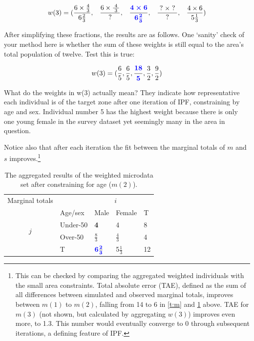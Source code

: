 \documentclass[a4paper, 11pt, twoside]{article}
\begin{document}
\begin{equation}
w(3) = (\frac{6 \times \frac{4}{3}}{6 \frac{2}{3}},\;\;\; \frac{6 \times
\frac{\;4\;}{\;3\;}}{\;?\;},\;\;\; \boldsymbol{ \frac{\color{blue}4 \times 6}{\color{blue} 6\frac{2}{3}
}}, \;\;\;\frac{\;?\; \times \;?\;}{?}, \;\;\;\frac{4 \times 6}{5 \frac{1}{3}})
\end{equation}

After simplifying these fractions, the results are as follows.
One `sanity' check of your method here is whether the sum of these
weights is still equal to the area's total population of twelve. Test this is
true:

\begin{equation}
w(3) = (\frac{6}{5}, \frac{6}{5}, \boldsymbol{\frac{\color{blue}18}{\color{blue}5}}, \frac{3}{2},
\frac{9}{2})
\label{finalout}
\end{equation}

What do the weights in w(3) actually mean? They indicate how representative
each individual is of the target zone after one iteration of IPF, constraining
by age and sex. Individual number 5 has the highest weight because there is
only one young female in the survey dataset yet seemingly many in the area in
question.

Notice also that after each iteration the fit between the marginal
totals of $m$ and $s$
improves.\footnote{This can be checked by comparing the aggregated weighted
individuals with the small area constraints. Total absolute error (TAE),
defined as the sum of all differences between simulated and observed marginal
totals, improves between $m(1)$ to $m(2)$, falling from
14 to 6 in \cref{t:m} and \cref{t:m2} above. TAE for $m(3)$ (not shown,
but calculated by aggregating $w(3)$) improves even more, to 1.3.
This number would eventually converge to 0 through subsequent
iterations, a defining feature of IPF.}


\begin{table}[htbp]
\centering
\caption[Aggregated results after constraining for age]{The
aggregated results of the weighted
microdata set after constraining for age ($m(2)$).
}

\begin{tabular}{cllll}\toprule
Marginal totals&  & \multicolumn{2}{c}{$i$} & \\
& Age/sex & Male & Female & T\\ \midrule
\multirow{2}{*}{$j$} & Under-50 & \textbf{\color{blue}4} & 4 & 8\\
& Over-50 & $\frac{8}{3}$ & $\frac{4}{3}$ & 4 \\
& T & $\boldsymbol{{\color{blue}6}\frac{\color{blue}2}{\color{blue}3}}$ & 5$\frac{1}{3}$ & 12\\
\bottomrule
\end{tabular}
\label{t:m2}
\end{table}
\end{document}
